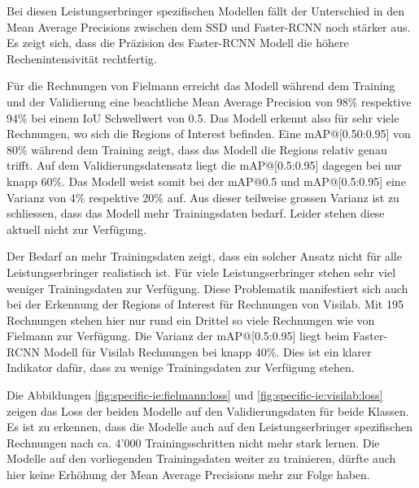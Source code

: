 Bei diesen Leistungserbringer spezifischen Modellen fällt der Unterschied in den Mean Average Precisions zwischen dem SSD und Faster-RCNN noch stärker aus. Es zeigt sich, dass die Präzision des Faster-RCNN Modell die höhere Rechenintensivität rechtfertig.

Für die Rechnungen von Fielmann erreicht das Modell während dem Training und der Validierung eine beachtliche Mean Average Precision von 98\% respektive 94\% bei einem IoU Schwellwert von 0.5. Das Modell erkennt also für sehr viele Rechnungen, wo sich die Regions of Interest befinden. Eine mAP@[0.50:0.95] von 80\% während dem Training zeigt, dass das Modell die Regions relativ genau trifft. Auf dem Validierungsdatensatz liegt die mAP@[0.5:0.95] dagegen bei nur knapp 60\%. Das Modell weist somit bei der mAP@0.5 und mAP@[0.5:0.95] eine Varianz von 4\% respektive 20\% auf. Aus dieser teilweise grossen Varianz ist zu schliessen, dass das Modell mehr Trainingsdaten bedarf. Leider stehen diese aktuell nicht zur Verfügung. 

Der Bedarf an mehr Trainingsdaten zeigt, dass ein solcher Ansatz nicht für alle Leistungserbringer realistisch ist. Für viele Leistungserbringer stehen sehr viel weniger Trainingsdaten zur Verfügung. Diese Problematik manifestiert sich auch bei der Erkennung der Regions of Interest für Rechnungen von Visilab. Mit 195 Rechnungen stehen hier nur rund ein Drittel so viele Rechnungen wie von Fielmann zur Verfügung. Die Varianz der mAP@[0.5:0.95] liegt beim Faster-RCNN Modell für Visilab Rechnungen bei knapp 40\%. Dies ist ein klarer Indikator dafür, dass zu wenige Trainingsdaten zur Verfügung stehen.

Die Abbildungen \ref{fig:specific-ie:fielmann:loss} und  \ref{fig:specific-ie:visilab:loss} zeigen das Loss der beiden Modelle auf den Validierungsdaten für beide Klassen. Es ist zu erkennen, dass die Modelle auch auf den Leistungserbringer spezifischen Rechnungen nach ca. 4'000 Trainingsschritten nicht mehr stark lernen. Die Modelle auf den vorliegenden Trainingsdaten weiter zu trainieren, dürfte auch hier keine Erhöhung der Mean Average Precisions mehr zur Folge haben.

